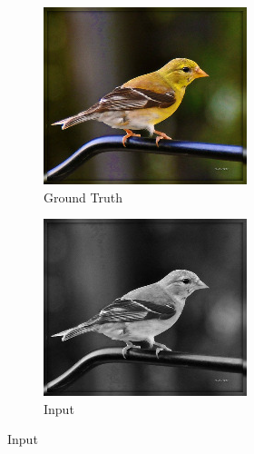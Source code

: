 \begin{figure}[t]
  \captionsetup[subfigure]{labelformat=empty}
  \begin{subfigure}[b]{0.244\textwidth}
    \includegraphics[width=\textwidth]{gfx/app-color-1}
    \caption{Ground Truth}
  \end{subfigure}
  \begin{subfigure}[b]{0.244\textwidth}
    \includegraphics[width=\textwidth]{gfx/app-color-2}
    \caption{Input}

\end{subfigure}
\end{figure}
